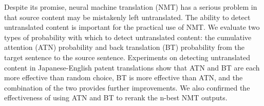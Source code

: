 Despite its promise, neural machine translation (NMT) has a serious problem in that source content may be mistakenly left untranslated. The ability to detect untranslated content is important for the practical use of NMT. We evaluate two types of probability with which to detect untranslated content: the cumulative attention (ATN) probability and back translation (BT) probability from the target sentence to the source sentence. Experiments on detecting untranslated content in Japanese-English patent translations show that ATN and BT are each more effective than random choice, BT is more effective than ATN, and the combination of the two provides further improvements. We also confirmed the effectiveness of using ATN and BT to rerank the n-best NMT outputs.
